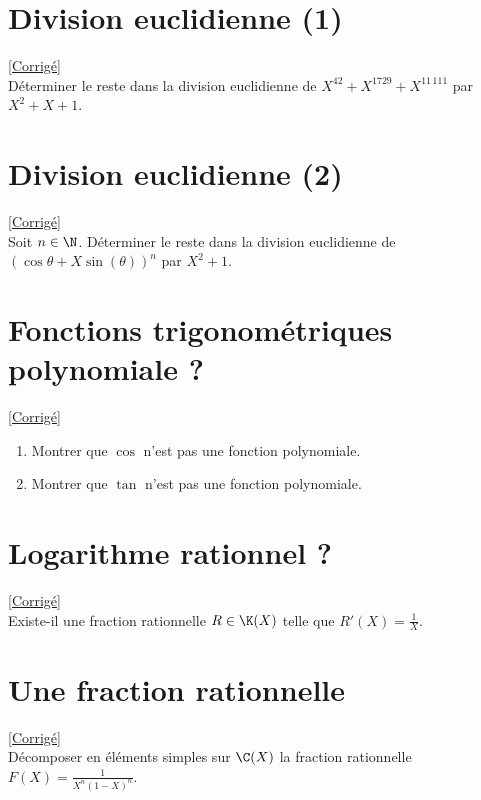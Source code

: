 \documentclass{book}
\begin{document}
	\section{Division euclidienne (1) }
	\textcolor{blue}{\hyperref[sec:division-euclidienne-(1)]{[Corrigé]}}\\
	\label{Division euclidienne (1)}
	Déterminer le reste dans la division euclidienne de $X^{42}+X^{1729}+X^{11\, 111}$ par $X^2+X+1$.
	
	\section{Division euclidienne (2) }
	\textcolor{blue}{\hyperref[sec:division-euclidienne-(2)]{[Corrigé]}}\\
	\label{Division euclidienne (2)}
	Soit $n\in\N$. Déterminer le reste dans la division euclidienne de $(\cos\theta+X\sin(\theta))^n$ par $X^2+1$.
	
	\section{Fonctions trigonométriques polynomiale ? }
	\textcolor{blue}{\hyperref[sec:fonctions-trigonométriques-polynomiales-?]{[Corrigé]}}\\
	\label{Fonctions trigonométriques polynomiales ?}
	\begin{enumerate}[leftmargin=*]
		\item Montrer que $\cos$ n'est pas une fonction polynomiale.
		\item Montrer que $\tan$ n'est pas une fonction polynomiale.
	\end{enumerate}
	
	\section{Logarithme rationnel ? }
	\textcolor{blue}{\hyperref[sec:logarithme-rationnel-?]{[Corrigé]}}\\
	\label{Logarithme rationnel ?}
	Existe-il une fraction rationnelle $R\in\K(X)$ telle que $R'(X)=\displaystyle\frac{1}{X}$.
	
	\section{Une fraction rationnelle }
	\textcolor{blue}{\hyperref[sec:une-fraction-rationnelle]{[Corrigé]}}\\
	\label{fractionrationnelle}
	\label{Une fraction rationnelle}
	Décomposer en éléments simples sur $\C(X)$ la fraction rationnelle $F(X)=\displaystyle\frac{1}{X^n(1-X)^n}$.
	
\end{document}
